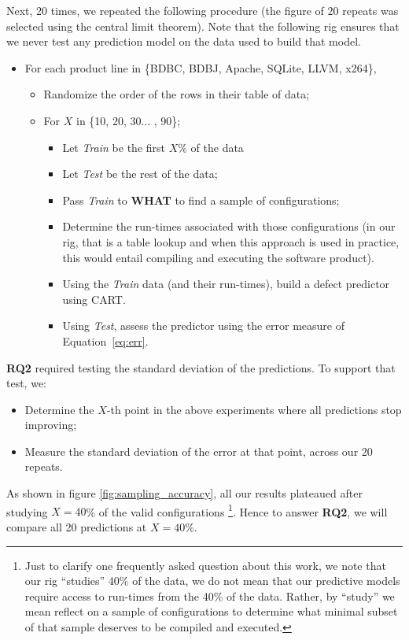 \documentclass{sig-alternative}
\newcommand{\bi}{\begin{itemize}}%
\newcommand{\ei}{\end{itemize}}
\newcommand{\eq}[1]{Equation~\ref{eq:#1}}
\newcommand{\what}{{\bf WHAT }}
\begin{document}
Next, 20 times, we repeated the following procedure (the figure of 20 repeats was
selected using the central limit theorem). Note that the following rig ensures that
we never test any prediction model on the data used to build that model.
\bi
\item For each  product line in \{BDBC, BDBJ, Apache, SQLite, LLVM, x264\},
\bi
\item Randomize the order of the rows in their table of data;
\item For $X$ in \{10, 20, 30... , 90\};
\bi
\item Let {\em Train} be the first $X$\% of the data 
\item Let {\em Test} be the rest of the data;
\item Pass {\em Train} to \what to find a sample of configurations;
\item Determine the run-times associated with those configurations (in our rig, that is a table lookup and when
this approach is used in practice, this would entail compiling and executing the software product).
\item Using the {\em Train}  data (and their run-times), build a defect predictor using CART.
\item Using {\em Test}, assess the predictor using the error 
measure of \eq{err}.
\ei
\ei
\ei
{\bf RQ2} required testing the standard deviation of the predictions. To support that test, we:
\bi
\item Determine the $X$-th point in the above experiments where all predictions stop improving;
\item Measure the standard deviation of the error at that point, across our 20 repeats.
\ei
As shown in figure \ref{fig:sampling_accuracy}, all our results plateaued after studying $X=40$\% of the valid configurations
 \footnote{Just to clarify one frequently asked question about this work, we note
that our rig ``studies'' 40\% of the data, we do not mean that our predictive models
 require access to run-times from the 40\% of the data. Rather, by ``study'' we mean   reflect 
 on a sample of configurations to determine what minimal subset of that
sample deserves to be compiled and executed.}.
 Hence to answer {\bf RQ2}, we will compare all 20 predictions at $X=40$\%.
 
\end{document}
